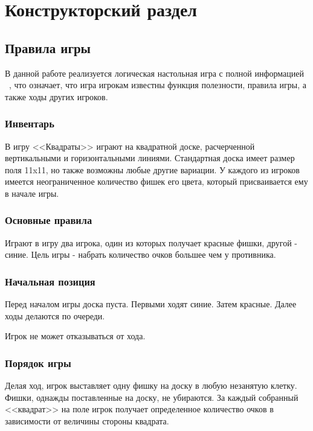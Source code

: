 \documentclass[a4paper,14pt]{extarticle}
\begin{document}
 	\newpage
 	
 	\section{Конструкторский раздел}
 	
 	\subsection{Правила игры}
 	
 	В данной работе реализуется логическая настольная игра с полной информацией ~\cite{game}, что означает, что игра игрокам известны функция полезности, правила игры, а также ходы других игроков.
 	
 	\subsubsection{Инвентарь}
 	
 	В игру <<Квадраты>> играют на квадратной доске, расчерченной вертикальными и горизонтальными линиями. Стандартная доска имеет размер поля 11x11, но также возможны любые другие вариации. У каждого из игроков имеется неограниченное количество фишек его цвета, который присваивается ему в начале игры.
 	
 	\subsubsection{Основные правила}
 	
 	Играют в игру два игрока, один из которых получает красные фишки, другой - синие. Цель игры - набрать количество очков большее чем у противника.
 	
 	\subsubsection{Начальная позиция}
 	
 	Перед началом игры доска пуста. Первыми ходят синие. Затем красные. Далее ходы делаются по очереди. 
 	
 	Игрок не может отказываться от хода.
 	
 	\subsubsection{Порядок игры}
 	
 	Делая ход, игрок выставляет одну фишку на доску в любую незанятую клетку. Фишки, однажды поставленные на доску, не убираются. За каждый собранный <<квадрат>> на поле игрок получает определенное количество очков в зависимости от величины стороны квадрата.
 	
\end{document}
